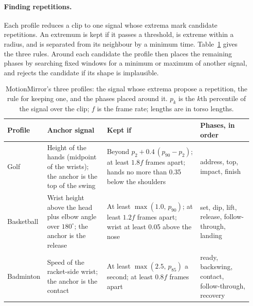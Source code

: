 \documentclass[sigconf,nonacm]{acmart}
\begin{document}
\paragraph{Finding repetitions.}
Each profile reduces a clip to one signal whose extrema mark candidate repetitions. An
extremum is kept if it passes a threshold, is extreme within a radius, and is separated from
its neighbour by a minimum time. Table~\ref{tab:mm} gives the three rules. Around each
candidate the profile then places the remaining phases by searching fixed windows for a
minimum or maximum of another signal, and rejects the candidate if its shape is implausible.

\begin{table}[t]
  \caption{MotionMirror's three profiles: the signal whose extrema propose a repetition, the
  rule for keeping one, and the phases placed around it. $p_k$ is the $k$th percentile of the
  signal over the clip; $f$ is the frame rate; lengths are in torso lengths.}
  \label{tab:mm}
  \small
  \begin{tabular}{@{}p{}p{}p{}p{}@{}}
    \toprule
    Profile & Anchor signal & Kept if & Phases, in order \\
    \midrule
    Golf & Height of the hands (midpoint of the wrists); the anchor is the top of the swing &
    Beyond $p_{2}+0.4\,(p_{90}-p_{2})$; at least $1.8f$ frames apart; hands no more than 0.35
    below the shoulders &
    address, top, impact, finish \\
    Basketball & Wrist height above the head plus elbow angle over $180^\circ$; the anchor is
    the release &
    At least $\max(1.0,\,p_{90})$; at least $1.2f$ frames apart; wrist at least 0.05 above
    the nose &
    set, dip, lift, release, follow-through, landing \\
    Badminton & Speed of the racket-side wrist; the anchor is the contact &
    At least $\max(2.5,\,p_{85})$ a second; at least $0.8f$ frames apart &
    ready, backswing, contact, follow-through, recovery \\
    \bottomrule
  \end{tabular}
\end{table}
\end{document}
